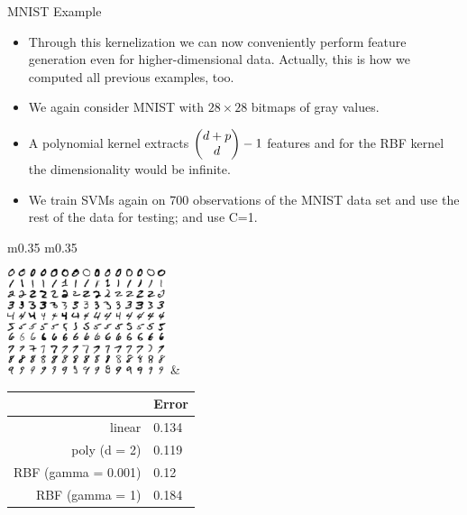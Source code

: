 \documentclass[11pt,compress,t,notes=noshow, xcolor=table]{beamer}
\begin{document}
\begin{vbframe}{MNIST Example}

    \begin{itemize}
      \item Through this kernelization we can now conveniently perform feature generation even
        for higher-dimensional data. Actually, this is how we computed all previous examples, too.
      \item We again consider MNIST with $28 \times 28$ bitmaps of gray values.
      \item A polynomial kernel extracts $\begin{pmatrix} d + p \\ d \end{pmatrix}-1$ features and for the RBF kernel the dimensionality would be infinite.
      \item We train SVMs again on 700 observations of the MNIST data set and use the rest of the data for testing; and use C=1.

    \end{itemize}

\begin{table}
\centering
\begin{tabular}{ m{} m{} }

\includegraphics[width = 0.35\textwidth ]{figure_man/introduction/mnist-eps-converted-to.pdf} &
\begin{tabular}{r|l}
	& Error \\ 
	\hline
	linear & 0.134 \\ 
	poly (d = 2) & 0.119 \\ 
	RBF (gamma = 0.001) & 0.12 \\ 
	RBF (gamma = 1) & 0.184 \\ 
\end{tabular}
\end{tabular}
\end{table}


\end{vbframe}
\end{document}
